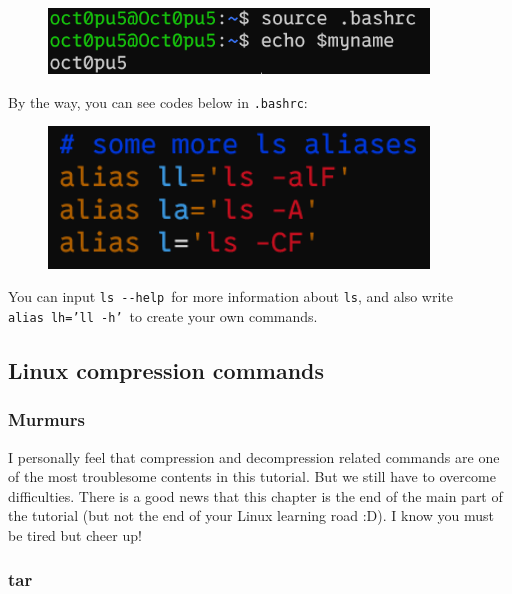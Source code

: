 \documentclass[12pt]{ctexart}
\begin{document}
\begin{figure}[H]
    \centering
    \includegraphics[width=0.9\textwidth,keepaspectratio]{assets/Linux/1.11 Linux environment variables/5.png}
\end{figure}

By the way, you can see codes below in \texttt{.bashrc}:

\begin{figure}[H]
    \centering
    \includegraphics[width=0.9\textwidth,keepaspectratio]{assets/Linux/1.11 Linux environment variables/6.png}
\end{figure}

You can input \texttt{ls\ -\/-help}\ for more information about
\texttt{ls}, and also write
\texttt{alias\ lh='ll\ -h'}\ to create
your own commands.

\newpage
\subsection{\textbf{Linux compression commands}}

\subsubsection{\textbf{Murmurs}}

I personally feel that compression and decompression related commands
are one of the most troublesome contents in this tutorial. But we still
have to overcome difficulties. There is a good news that this chapter is
the end of the main part of the tutorial (but not the end of your Linux
learning road :D). I know you must be tired but cheer up!

\subsubsection{\textbf{tar}}
\end{document}
